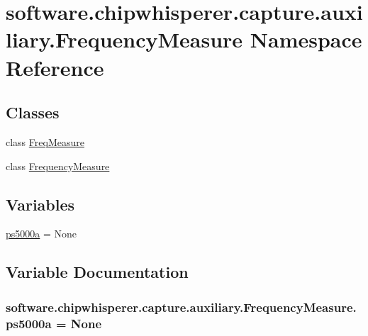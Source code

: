 \hypertarget{namespacesoftware_1_1chipwhisperer_1_1capture_1_1auxiliary_1_1FrequencyMeasure}{}\section{software.\+chipwhisperer.\+capture.\+auxiliary.\+Frequency\+Measure Namespace Reference}
\label{namespacesoftware_1_1chipwhisperer_1_1capture_1_1auxiliary_1_1FrequencyMeasure}
\subsection*{Classes}
\begin{DoxyCompactItemize}
\item 
class \hyperlink{classsoftware_1_1chipwhisperer_1_1capture_1_1auxiliary_1_1FrequencyMeasure_1_1FreqMeasure}{Freq\+Measure}
\item 
class \hyperlink{classsoftware_1_1chipwhisperer_1_1capture_1_1auxiliary_1_1FrequencyMeasure_1_1FrequencyMeasure}{Frequency\+Measure}
\end{DoxyCompactItemize}
\subsection*{Variables}
\begin{DoxyCompactItemize}
\item 
\hyperlink{namespacesoftware_1_1chipwhisperer_1_1capture_1_1auxiliary_1_1FrequencyMeasure_a8d13a321df4dee1fe07c0bad8860839b}{ps5000a} = None
\end{DoxyCompactItemize}


\subsection{Variable Documentation}
\hypertarget{namespacesoftware_1_1chipwhisperer_1_1capture_1_1auxiliary_1_1FrequencyMeasure_a8d13a321df4dee1fe07c0bad8860839b}{}
\subsubsection[{ps5000a}]{\setlength{\rightskip}{0pt plus 5cm}software.\+chipwhisperer.\+capture.\+auxiliary.\+Frequency\+Measure.\+ps5000a = None}\label{namespacesoftware_1_1chipwhisperer_1_1capture_1_1auxiliary_1_1FrequencyMeasure_a8d13a321df4dee1fe07c0bad8860839b}
